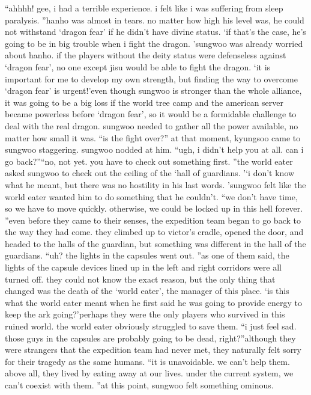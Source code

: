 “ahhhh! gee, i had a terrible experience.
 i felt like i was suffering from sleep paralysis.
”hanho was almost in tears.
 no matter how high his level was, he could not withstand ‘dragon fear’ if he didn’t have divine status.
‘if that’s the case, he’s going to be in big trouble when i fight the dragon.
’sungwoo was already worried about hanho.
 if the players without the deity status were defenseless against ‘dragon fear’, no one except jisu would be able to fight the dragon.
‘it is important for me to develop my own strength, but finding the way to overcome ‘dragon fear’ is urgent!’even though sungwoo is stronger than the whole alliance, it was going to be a big loss if the world tree camp and the american server became powerless before ‘dragon fear’, so it would be a formidable challenge to deal with the real dragon.
 sungwoo needed to gather all the power available, no matter how small it was.
“is the fight over?”
at that moment, kyungsoo came to sungwoo staggering.
 sungwoo nodded at him.
“ugh, i didn’t help you at all.
 can i go back?”“no, not yet.
 you have to check out something first.
”the world eater asked sungwoo to check out the ceiling of the ‘hall of guardians.
’‘i don’t know what he meant, but there was no hostility in his last words.
’sungwoo felt like the world eater wanted him to do something that he couldn’t.
“we don’t have time, so we have to move quickly.
 otherwise, we could be locked up in this hell forever.
”even before they came to their senses, the expedition team began to go back to the way they had come.
 they climbed up to victor’s cradle, opened the door, and headed to the halls of the guardian, but something was different in the hall of the guardians.
“uh? the lights in the capsules went out.
”as one of them said, the lights of the capsule devices lined up in the left and right corridors were all turned off.
 they could not know the exact reason, but the only thing that changed was the death of the ‘world eater’, the manager of this place.
‘is this what the world eater meant when he first said he was going to provide energy to keep the ark going?’perhaps they were the only players who survived in this ruined world.
 the world eater obviously struggled to save them.
“i just feel sad.
 those guys in the capsules are probably going to be dead, right?”although they were strangers that the expedition team had never met, they naturally felt sorry for their tragedy as the same humans.
“it is unavoidable.
 we can’t help them.
 above all, they lived by eating away at our lives.
 under the current system, we can’t coexist with them.
”at this point, sungwoo felt something ominous.
